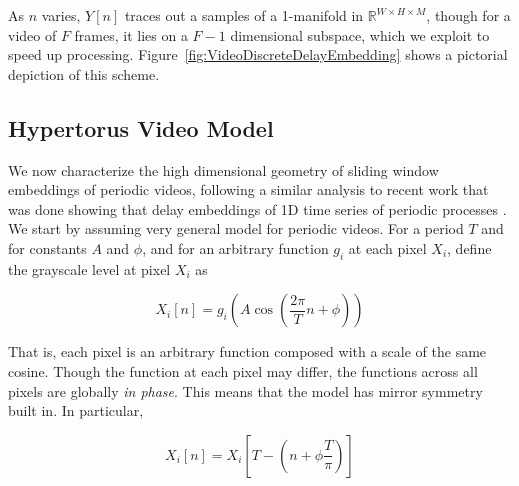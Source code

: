 \documentclass[a4paper,UKenglish]{lipics}
\begin{document}
As $n$ varies, $Y[n]$ traces out a samples of a 1-manifold in $\mathbb{R}^{W \times H \times M}$, though for a video of $F$ frames, it lies on a $F-1$ dimensional subspace, which we exploit to speed up processing. Figure~\ref{fig:VideoDiscreteDelayEmbedding} shows a pictorial depiction of this scheme.

\subsection{Hypertorus Video Model}
\label{sec:VideoModel}


We now characterize the high dimensional geometry of sliding window embeddings of periodic videos, following a similar analysis to recent work that was done showing that delay embeddings of 1D time series of periodic processes \cite{perea2013sliding}.  We start by assuming very general model for periodic videos.  For a period $T$ and for constants $A$ and $\phi$, and for an arbitrary function $g_i$ at each pixel $X_i$, define the grayscale level at pixel $X_i$ as 

\begin{equation}
X_i[n] = g_i \left( A \cos \left( \frac{2 \pi}{T} n + \phi \right) \right)
\end{equation}

That is, each pixel is an arbitrary function composed with a scale of the same cosine.  Though the function at each pixel may differ, the functions across all pixels are globally {\em in phase}.  This means that the model has mirror symmetry built in.  In particular,

\begin{equation}
X_i[n] = X_i\left[ T - \left(n + \phi \frac{T}{\pi} \right) \right]
\end{equation}
\end{document}
